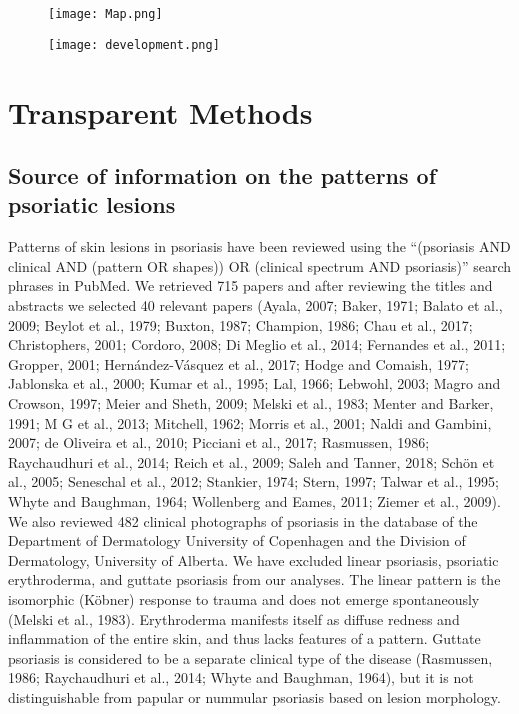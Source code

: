 \begin{figure}[h]
	\centering
	\texttt{[image: Map.png]}
	\label{fig:pso3}
\end{figure}

\begin{figure}[h]
	\centering
	\texttt{[image: development.png]}
	\label{fig:pso4}
\end{figure}

\section{Transparent Methods}
\subsection{Source of information on the patterns of psoriatic lesions}
Patterns of skin lesions in psoriasis have been reviewed using the “(psoriasis AND clinical AND (pattern OR shapes)) OR (clinical spectrum AND psoriasis)” search phrases in PubMed. We retrieved 715 papers and after reviewing the titles and abstracts we selected 40 relevant papers (Ayala, 2007; Baker, 1971; Balato et al., 2009; Beylot et al., 1979; Buxton, 1987; Champion, 1986; Chau et al., 2017; Christophers, 2001; Cordoro, 2008; Di Meglio et al., 2014; Fernandes et al., 2011; Gropper, 2001; Hernández-Vásquez et al., 2017; Hodge and Comaish, 1977; Jablonska et al., 2000; Kumar et al., 1995; Lal, 1966; Lebwohl, 2003; Magro and Crowson, 1997; Meier and Sheth, 2009; Melski et al., 1983; Menter and Barker, 1991; M G et al., 2013; Mitchell, 1962; Morris et al., 2001; Naldi and Gambini, 2007; de Oliveira et al., 2010; Picciani et al., 2017; Rasmussen, 1986; Raychaudhuri et al., 2014; Reich et al., 2009; Saleh and Tanner, 2018; Schön et al., 2005; Seneschal et al., 2012; Stankier, 1974; Stern, 1997; Talwar et al., 1995; Whyte and Baughman, 1964; Wollenberg and Eames, 2011; Ziemer et al., 2009). We also reviewed 482 clinical photographs of psoriasis in the database of the Department of Dermatology University of Copenhagen and the Division of Dermatology, University of Alberta. We have excluded linear psoriasis, psoriatic erythroderma, and guttate psoriasis from our analyses. The linear pattern is the isomorphic (Köbner) response to trauma and does not emerge spontaneously (Melski et al., 1983). Erythroderma manifests itself as diffuse redness and inflammation of the entire skin, and thus lacks features of a pattern. Guttate psoriasis is considered to be a separate clinical type of the disease (Rasmussen, 1986; Raychaudhuri et al., 2014; Whyte and Baughman, 1964), but it is not distinguishable from papular or nummular psoriasis based on lesion morphology. 

